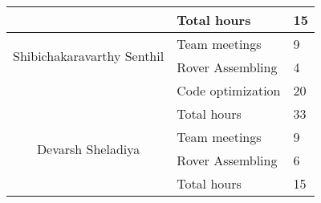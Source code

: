 \begin{table}[h]
\begin{tabular}{|c|p{8cm}|p{2cm}|}
         \cline{2-3}
         & \cellcolor{cyan}Total hours &  \cellcolor{cyan} 15  \\  
        \hline
        \multirow{2}{*}{Shibichakaravarthy Senthil}  
         & Team meetings    & 9 \\
        \cline{2-3}
         & Rover Assembling   & 4 \\
          \cline{2-3}
         & Code optimization   & 20 \\
          \cline{2-3}
         & \cellcolor{cyan}Total hours &  \cellcolor{cyan} 33  \\
        \hline
        \multirow{2}{*}{Devarsh Sheladiya}  
         & Team meetings    & 9 \\
        \cline{2-3}
       & Rover Assembling   & 6 \\
        \cline{2-3}
         & \cellcolor{cyan}Total hours &  \cellcolor{cyan} 15  \\
        \hline
    \end{tabular}
    \label{tab:merged_cells}
\end{table}